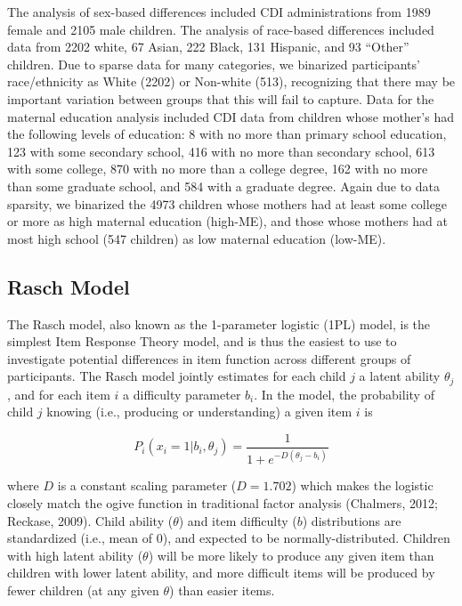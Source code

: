 \documentclass[10pt, letterpaper]{article}
\begin{document}
The analysis of sex-based differences included CDI administrations from
1989 female and 2105 male children. The analysis of race-based
differences included data from 2202 white, 67 Asian, 222 Black, 131
Hispanic, and 93 ``Other'' children. Due to sparse data for many
categories, we binarized participants' race/ethnicity as White (2202) or
Non-white (513), recognizing that there may be important variation
between groups that this will fail to capture. Data for the maternal
education analysis included CDI data from children whose mother's had
the following levels of education: 8 with no more than primary school
education, 123 with some secondary school, 416 with no more than
secondary school, 613 with some college, 870 with no more than a college
degree, 162 with no more than some graduate school, and 584 with a
graduate degree. Again due to data sparsity, we binarized the 4973
children whose mothers had at least some college or more as high
maternal education (high-ME), and those whose mothers had at most high
school (547 children) as low maternal education (low-ME).

\hypertarget{rasch-model}{%
\subsection{Rasch Model}\label{rasch-model}}

The Rasch model, also known as the 1-parameter logistic (1PL) model, is
the simplest Item Response Theory model, and is thus the easiest to use
to investigate potential differences in item function across different
groups of participants. The Rasch model jointly estimates for each child
\(j\) a latent ability \(\theta_j\), and for each item \(i\) a
difficulty parameter \(b_i\). In the model, the probability of child
\(j\) knowing (i.e., producing or understanding) a given item \(i\) is

\[P_{i}(x_i = 1 | b_{i},\theta_j ) = \frac{1}{1 + e^{-D(\theta_j - b_i )}}\]

\noindent where \(D\) is a constant scaling parameter (\(D=1.702\))
which makes the logistic closely match the ogive function in traditional
factor analysis (Chalmers, 2012; Reckase, 2009). Child ability
(\(\theta\)) and item difficulty (\(b\)) distributions are standardized
(i.e., mean of 0), and expected to be normally-distributed. Children
with high latent ability (\(\theta\)) will be more likely to produce any
given item than children with lower latent ability, and more difficult
items will be produced by fewer children (at any given \(\theta\)) than
easier items.
\end{document}
